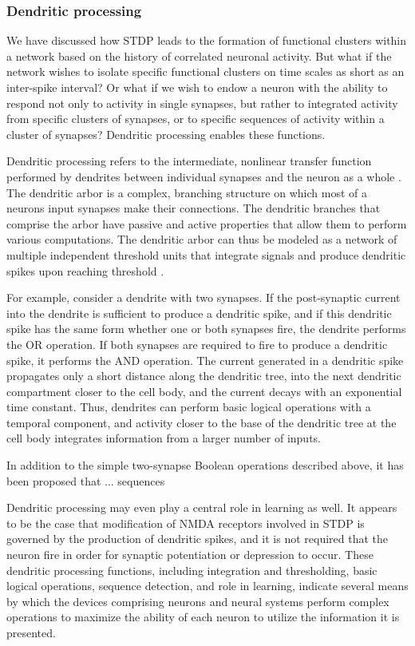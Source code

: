 \documentclass[twocolumn]{article}
\begin{document}
\subsubsection{Dendritic processing}
We have discussed how STDP leads to the formation of functional clusters within a network based on the history of correlated neuronal activity. But what if the network wishes to isolate specific functional clusters on time scales as short as an inter-spike interval? Or what if we wish to endow a neuron with the ability to respond not only to activity in single synapses, but rather to integrated activity from specific clusters of synapses, or to specific sequences of activity within a cluster of synapses? Dendritic processing enables these functions.

Dendritic processing refers to the intermediate, nonlinear transfer function performed by dendrites between individual synapses and the neuron as a whole \cite{stsp2015}. The dendritic arbor is a complex, branching structure on which most of a neurons input synapses make their connections. The dendritic branches that comprise the arbor have passive and active properties that allow them to perform various computations. The dendritic arbor can thus be modeled as a network of multiple independent threshold units that integrate signals and produce dendritic spikes upon reaching threshold \cite{sava2017}.

For example, consider a dendrite with two synapses. If the post-synaptic current into the dendrite is sufficient to produce a dendritic spike, and if this dendritic spike has the same form whether one or both synapses fire, the dendrite performs the OR operation. If both synapses are required to fire to produce a dendritic spike, it performs the AND operation. The current generated in a dendritic spike propagates only a short distance along the dendritic tree, into the next dendritic compartment closer to the cell body, and the current decays with an exponential time constant. Thus, dendrites can perform basic logical operations with a temporal component, and activity closer to the base of the dendritic tree at the cell body integrates information from a larger number of inputs. 

In addition to the simple two-synapse Boolean operations described above, it has been proposed that ... sequences 

Dendritic processing may even play a central role in learning as well. It appears to be the case that modification of NMDA receptors involved in STDP is governed by the production of dendritic spikes, and it is not required that the neuron fire in order for synaptic potentiation or depression to occur. These dendritic processing functions, including integration and thresholding, basic logical operations, sequence detection, and role in learning, indicate several means by which the devices comprising neurons and neural systems perform complex operations to maximize the ability of each neuron to utilize the information it is presented. 
\end{document}
